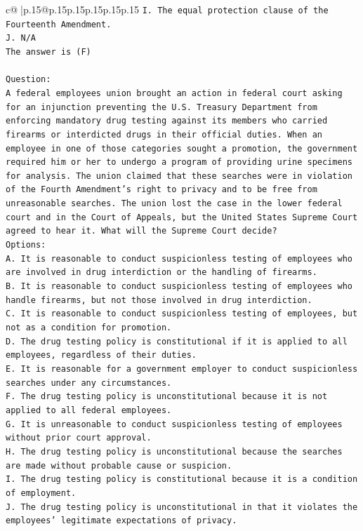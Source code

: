 \documentclass{article}
\begin{document}
{\begin{supertabular}{c@{$\;$}|p{.15\linewidth}@{}p{.15\linewidth}p{.15\linewidth}p{.15\linewidth}p{.15\linewidth}p{.15\linewidth}}
{{{\texttt{I. The equal protection clause of the Fourteenth Amendment.} \\
\texttt{J. N/A} \\
\texttt{The answer is (F)} \\
\\ 
\texttt{Question:} \\
\texttt{A federal employees union brought an action in federal court asking for an injunction preventing the U.S. Treasury Department from enforcing mandatory drug testing against its members who carried firearms or interdicted drugs in their official duties. When an employee in one of those categories sought a promotion, the government required him or her to undergo a program of providing urine specimens for analysis. The union claimed that these searches were in violation of the Fourth Amendment's right to privacy and to be free from unreasonable searches. The union lost the case in the lower federal court and in the Court of Appeals, but the United States Supreme Court agreed to hear it. What will the Supreme Court decide?} \\
\texttt{Options:} \\
\texttt{A. It is reasonable to conduct suspicionless testing of employees who are involved in drug interdiction or the handling of firearms.} \\
\texttt{B. It is reasonable to conduct suspicionless testing of employees who handle firearms, but not those involved in drug interdiction.} \\
\texttt{C. It is reasonable to conduct suspicionless testing of employees, but not as a condition for promotion.} \\
\texttt{D. The drug testing policy is constitutional if it is applied to all employees, regardless of their duties.} \\
\texttt{E. It is reasonable for a government employer to conduct suspicionless searches under any circumstances.} \\
\texttt{F. The drug testing policy is unconstitutional because it is not applied to all federal employees.} \\
\texttt{G. It is unreasonable to conduct suspicionless testing of employees without prior court approval.} \\
\texttt{H. The drug testing policy is unconstitutional because the searches are made without probable cause or suspicion.} \\
\texttt{I. The drug testing policy is constitutional because it is a condition of employment.} \\
\texttt{J. The drug testing policy is unconstitutional in that it violates the employees' legitimate expectations of privacy.} \\
            }
        }
    }
     \\ \\


\end{supertabular}}
\end{document}
